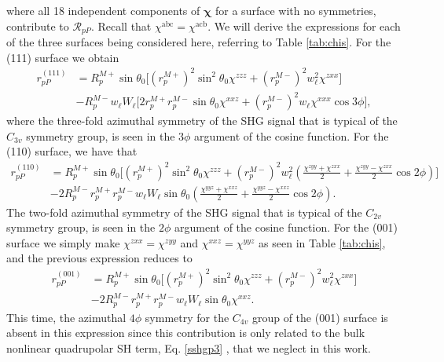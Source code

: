 where all 18 independent components of $\boldsymbol{\chi}$ for a surface with no
symmetries, contribute to $\mathcal{R}_{pP}$. Recall that $\chi^{\mathrm{abc}} =
\chi^{\mathrm{acb}}$. We will derive  the expressions for each of the three
surfaces being considered here, referring to Table \ref{tab:chis}. For the (111)
surface we obtain
\begin{equation}\label{eq:rpp111}
\begin{split}
r^{(111)}_{pP} &= 
R^{M+}_{p}\sin\theta_{0}
\Big[
  \left(r^{M+}_{p}\right)^{2}\sin^{2}\theta_{0}\chi^{zzz}
+ \left(r^{M-}_{p}\right)^{2}w^{2}_{\ell}\chi^{zxx}
\Big]\\
&- R^{M-}_{p}w_{\ell}W_{\ell}
\Big[
  2r^{M+}_{p}r^{M-}_{p}\sin\theta_{0}\chi^{xxz}
+ \left(r^{M-}_{p}\right)^{2}w_{\ell}\chi^{xxx}\cos3\phi
\Big],
\end{split}
\end{equation}
where the three-fold azimuthal symmetry of the SHG signal that is typical of the
$C_{3v}$ symmetry group, is seen in the $3\phi$ argument of the cosine function.
For the (110) surface, we have that
\begin{equation}\label{eq:rpp110}
\begin{split}
r^{(110)}_{pP} &= 
R^{M+}_{p}\sin\theta_{0}
\Bigg[
  \left(r^{M+}_{p}\right)^{2}\sin^{2}\theta_{0}\chi^{zzz}
+ \left(r^{M-}_{p}\right)^{2}w^{2}_{\ell}
\left(
\frac{\chi^{zyy} + \chi^{zxx}}{2} + \frac{\chi^{zyy} - \chi^{zxx}}{2}\cos2\phi 
\right) 
\Bigg]\\
&- 2R^{M-}_{p}r^{M+}_{p}r^{M-}_{p}w_{\ell}W_{\ell}\sin\theta_{0}
\left(
\frac{\chi^{yyz} + \chi^{xxz}}{2} + \frac{\chi^{yyz} - \chi^{xxz}}{2}\cos2\phi 
\right). 
\end{split}
\end{equation}
The two-fold azimuthal symmetry of the SHG signal that is typical of the
$C_{2v}$ symmetry group, is seen in the $2\phi$ argument of the cosine function.
For the (001) surface we simply make $\chi^{zxx}=\chi^{zyy}$ and
$\chi^{xxz}=\chi^{yyz}$ as seen in Table \ref{tab:chis}, and the previous
expression reduces to
\begin{equation}\label{rpp001}
\begin{split}
r^{(001)}_{pP} &= 
R^{M+}_{p}\sin\theta_{0}
\bigg[
  \left(r^{M+}_{p}\right)^{2}\sin^{2}\theta_{0}\chi^{zzz}
+ \left(r^{M-}_{p}\right)^{2}w^{2}_{\ell}\chi^{zxx}
\bigg]\\
&- 2R^{M-}_{p}r^{M+}_{p}r^{M-}_{p}w_{\ell}W_{\ell}\sin\theta_{0}\chi^{xxz}.
\end{split}
\end{equation}
This time, the azimuthal $4\phi$ symmetry for the $C_{4v}$ group of the (001)
surface is absent in this  expression since this contribution is only related to
the bulk nonlinear quadrupolar SH term, Eq. \eqref{sshgp3} \cite{sipePRB87},
that we neglect in this work.


